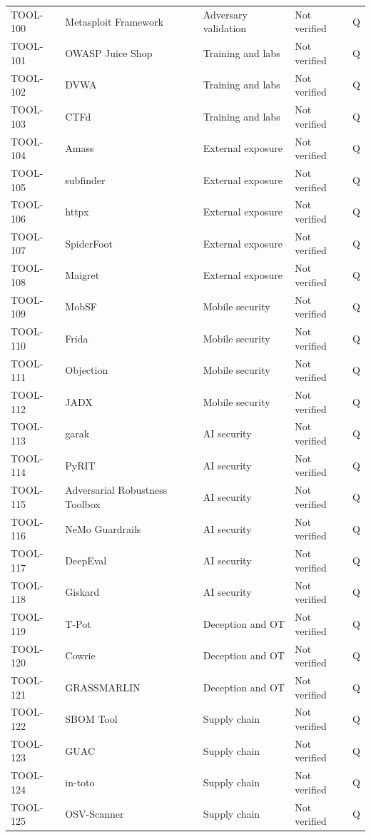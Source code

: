 \documentclass[11pt,oneside]{report}
\begin{document}
\begin{longtable}{P{0.10\textwidth}P{0.32\textwidth}P{0.22\textwidth}P{0.155\textwidth}P{0.055\textwidth}}
TOOL-100 & Metasploit Framework & Adversary validation & Not verified & Q \\
TOOL-101 & OWASP Juice Shop & Training and labs & Not verified & Q \\
TOOL-102 & DVWA & Training and labs & Not verified & Q \\
TOOL-103 & CTFd & Training and labs & Not verified & Q \\
TOOL-104 & Amass & External exposure & Not verified & Q \\
TOOL-105 & subfinder & External exposure & Not verified & Q \\
TOOL-106 & httpx & External exposure & Not verified & Q \\
TOOL-107 & SpiderFoot & External exposure & Not verified & Q \\
TOOL-108 & Maigret & External exposure & Not verified & Q \\
TOOL-109 & MobSF & Mobile security & Not verified & Q \\
TOOL-110 & Frida & Mobile security & Not verified & Q \\
TOOL-111 & Objection & Mobile security & Not verified & Q \\
TOOL-112 & JADX & Mobile security & Not verified & Q \\
TOOL-113 & garak & AI security & Not verified & Q \\
TOOL-114 & PyRIT & AI security & Not verified & Q \\
TOOL-115 & Adversarial Robustness Toolbox & AI security & Not verified & Q \\
TOOL-116 & NeMo Guardrails & AI security & Not verified & Q \\
TOOL-117 & DeepEval & AI security & Not verified & Q \\
TOOL-118 & Giskard & AI security & Not verified & Q \\
TOOL-119 & T-Pot & Deception and OT & Not verified & Q \\
TOOL-120 & Cowrie & Deception and OT & Not verified & Q \\
TOOL-121 & GRASSMARLIN & Deception and OT & Not verified & Q \\
TOOL-122 & SBOM Tool & Supply chain & Not verified & Q \\
TOOL-123 & GUAC & Supply chain & Not verified & Q \\
TOOL-124 & in-toto & Supply chain & Not verified & Q \\
TOOL-125 & OSV-Scanner & Supply chain & Not verified & Q \\

\end{longtable}
\end{document}
